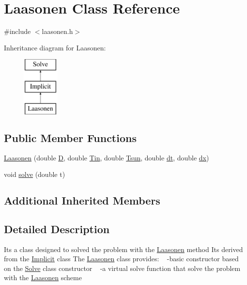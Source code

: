 \hypertarget{class_laasonen}{}\section{Laasonen Class Reference}
\label{class_laasonen}


{\ttfamily \#include $<$laasonen.\+h$>$}

Inheritance diagram for Laasonen\+:\begin{figure}[H]
\begin{center}
\leavevmode
\includegraphics[height=3.000000cm]{class_laasonen}
\end{center}
\end{figure}
\subsection*{Public Member Functions}
\begin{DoxyCompactItemize}
\item 
\hyperlink{class_laasonen_ad20d5e371558ef7c4f04f730daef0049}{Laasonen} (double \hyperlink{class_solve_ab6b73352e9bca73bad1b133fc84f008c}{D}, double \hyperlink{class_solve_a324c747af91a26a206d7772853b8655e}{Tin}, double \hyperlink{class_solve_a7145536b49fb1ac4d2f36f800d118616}{Tsun}, double \hyperlink{class_solve_ac1befb9c006f895fb0517e19c412ca57}{dt}, double \hyperlink{class_solve_a21b9b8118f508e079f066d2ce2816dd1}{dx})
\item 
void \hyperlink{class_laasonen_aaa49ab7d15fbfef94a57a0e89977d1c6}{solve} (double t)
\end{DoxyCompactItemize}
\subsection*{Additional Inherited Members}


\subsection{Detailed Description}
It\textquotesingle{}s a class designed to solved the problem with the \hyperlink{class_laasonen}{Laasonen} method It\textquotesingle{}s derived from the \hyperlink{class_implicit}{Implicit} class The \hyperlink{class_laasonen}{Laasonen} class provides\+: ~\newline
-\/basic constructor based on the \hyperlink{class_solve}{Solve} class constructor ~\newline
-\/a virtual solve function that solve the problem with the \hyperlink{class_laasonen}{Laasonen} scheme 

